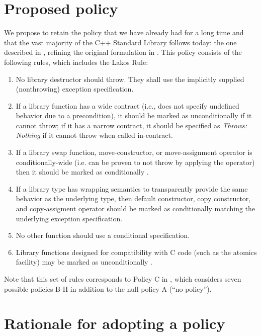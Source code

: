 
\section{Proposed policy}
\label{sec:policy}

We propose to retain the  policy that we have already had for a long time and that the vast majority of the C++ Standard Library follows today: the one described in \cite{P0884R0}, refining the original formulation in \cite{N3279}. This policy consists of the following rules, which includes the Lakos Rule:
\begin{enumerate}[label=\alph*)]
\item No library destructor should throw. They shall use the implicitly supplied (nonthrowing)
exception specification.
\item If a library function has a wide contract (i.e., does not specify undefined behavior due to a precondition), it should be marked as unconditionally  if it cannot throw; if it has a narrow contract, it should be specified as \emph{Throws: Nothing} if it cannot throw when called in-contract.
\item If a library swap function, move-constructor, or move-assignment operator is
conditionally-wide (i.e. can be proven to not throw by applying the  operator)
then it should be marked as conditionally .
\item If a library type has wrapping semantics to transparently provide the same behavior as
the underlying type, then default constructor, copy constructor, and copy-assigment
operator should be marked as conditionally  matching the underlying exception
specification.
\item No other function should use a conditional  specification.
\item Library functions designed for compatibility with C code (such as the atomics facility)
may be marked as unconditionally . 
\end{enumerate}
Note that this set of rules corresponds to Policy C in \cite{P3005R0}, which considers seven possible  policies B-H in addition to the null policy A (``no policy'').


\section{Rationale for adopting a policy}
\label{sec:rationale_adopt}

